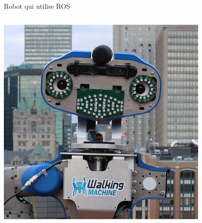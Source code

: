 \documentclass{beamer}
\begin{document}
\begin{frame}{Robot qui utilise ROS}
\begin{columns}
	\includegraphics[width=\textwidth]{sara.jpg}
	

\end{columns}
\end{frame}
\end{document}
